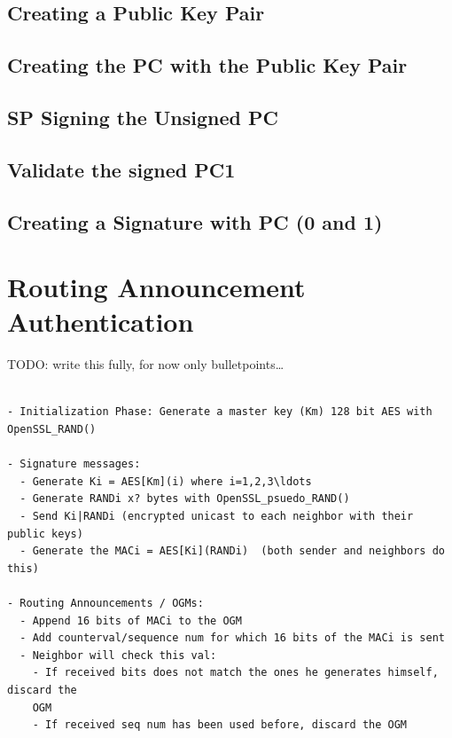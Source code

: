 \subsection{Creating a Public Key Pair}

\subsection{Creating the \ac{PC} with the Public Key Pair}

\subsection{\ac{SP} Signing the Unsigned \ac{PC}}

\subsection{Validate the signed \ac{PC1}}

\subsection{Creating a Signature with \ac{PC} (0 and 1)}

\section{Routing Announcement Authentication}
TODO: write this fully, for now only bulletpoints\ldots


\begin{lstlisting}

- Initialization Phase: Generate a master key (Km) 128 bit AES with
OpenSSL_RAND()

- Signature messages:
  - Generate Ki = AES[Km](i) where i=1,2,3\ldots
  - Generate RANDi x? bytes with OpenSSL_psuedo_RAND()
  - Send Ki|RANDi (encrypted unicast to each neighbor with their public keys)
  - Generate the MACi = AES[Ki](RANDi)  (both sender and neighbors do this)

- Routing Announcements / OGMs:
  - Append 16 bits of MACi to the OGM
  - Add counterval/sequence num for which 16 bits of the MACi is sent
  - Neighbor will check this val:
    - If received bits does not match the ones he generates himself, discard the
    OGM
    - If received seq num has been used before, discard the OGM

\end{lstlisting}